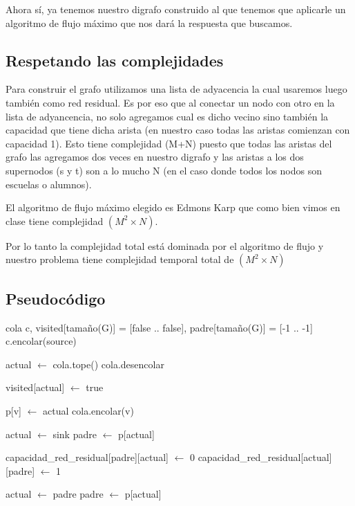 Ahora sí, ya tenemos nuestro digrafo construido al que tenemos que aplicarle un algoritmo de flujo máximo que nos dará la respuesta que buscamos.

\subsection{Respetando las complejidades}

Para construir el grafo utilizamos una lista de adyacencia la cual usaremos luego también como red residual. Es por eso que al conectar un nodo con otro en la lista de adyancencia, no solo agregamos cual es dicho vecino sino también la capacidad que tiene dicha arista (en nuestro caso todas las aristas comienzan con capacidad 1). Esto tiene complejidad \bigo(M+N) puesto que todas las aristas del grafo las agregamos dos veces en nuestro digrafo y las aristas a los dos supernodos (s y t) son a lo mucho N (en el caso donde todos los nodos son escuelas o alumnos). 

El algoritmo de flujo máximo elegido es Edmons Karp que como bien vimos en clase tiene complejidad \bigo$(M^2 \times N)$.

Por lo tanto la complejidad total está dominada por el algoritmo de flujo y nuestro problema tiene complejidad temporal total de \bigo$(M^2 \times N)$

\subsection{Pseudocódigo}
	
\begin{algorithmic}
	\State cola c, visited[tamaño(G)] = [false .. false], padre[tamaño(G)] = [-1 .. -1]
	\State c.encolar(source)
	

		\State actual $\leftarrow$ cola.tope()
		\State cola.desencolar
		
		\State visited[actual] $\leftarrow$ true
	
		 
					\State p[v] $\leftarrow$ actual
					\State cola.encolar(v)
				\EndIf
		\EndFor 
	\EndWhile

		\State {} 
	\EndIf

	\State actual $\leftarrow$ sink
	\State padre $\leftarrow$ p[actual]
	
		\State capacidad_red_residual[padre][actual] $\leftarrow$ 0
		\State capacidad_red_residual[actual][padre] $\leftarrow$ 1
		
		\State actual $\leftarrow$ padre
		\State padre $\leftarrow$ p[actual]
	\EndWhile

	\State {} 
\EndFunction
\end{algorithmic}
\hspace{1cm}

